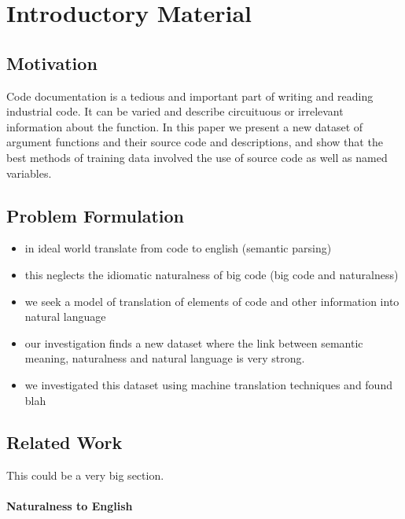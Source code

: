 \chapter{Introductory Material}
\label{chapterlabel1}

\section{Motivation} %
\label{sec:motivation}


Code documentation is a tedious and important part of writing and reading industrial code. It can be varied and describe circuituous or irrelevant information about the function. In this paper we present a new dataset of argument functions and their source code and descriptions, and show that the best methods of training data involved the use of source code as well as named variables. 

\section{Problem Formulation} %
\label{sec:problem_formulation}

\begin{itemize}
    \item in ideal world translate from code to english (semantic parsing)
    \item this neglects the idiomatic naturalness of big code (big code and naturalness)
    \item we seek a model of translation of elements of code and other information into natural language
    \item our investigation finds a new dataset where the link between semantic meaning, naturalness and natural language is very strong. 
    \item we investigated this dataset using machine translation techniques and found blah
\end{itemize}
 
\section{Related Work} %

This could be a very big section. 

\subsubsection{Naturalness to English} %
\label{ssub:naturalness_to_english}

